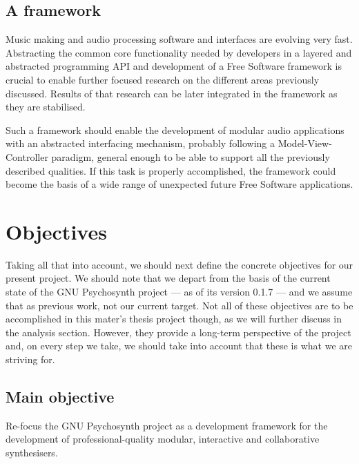 \subsection{A framework}

Music making and audio processing software and
interfaces are evolving very fast. Abstracting the common core
functionality needed by developers in a layered and abstracted
programming API and development of a Free Software
\cite{stallman2002free} framework is crucial to enable further focused
research on the different areas previously discussed. Results of that
research can be later integrated in the framework as they are
stabilised.

Such a framework should enable the development of modular audio
applications with an abstracted interfacing mechanism, probably
following a Model-View-Controller
paradigm, general enough to be able to support all the previously
described qualities. If this task is properly accomplished, the
framework could become the basis of a wide range of unexpected future
Free Software applications.

\section{Objectives}

Taking all that into account, we should next define the concrete
objectives for our present project. We should note that we depart from
the basis of the current state of the GNU Psychosynth project --- as
of its version 0.1.7 --- and we assume that as previous work, not our
current target. Not all of these objectives are to be accomplished in
this mater's thesis project though, as we will further discuss in the
analysis section. However, they provide a long-term perspective of the
project and, on every step we take, we should take into account that
these is what we are striving for.

\subsection{Main objective}
\label{sec:mainobjective}
\label{sec:userinterface}

\begin{objective}
  Re-focus the GNU Psychosynth project as a development framework for
  the development of professional-quality modular, interactive and
  collaborative synthesisers.
\end{objective}

